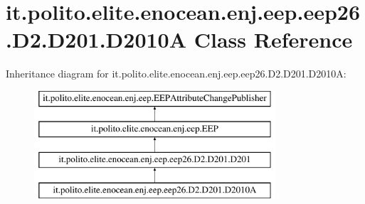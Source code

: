 \hypertarget{classit_1_1polito_1_1elite_1_1enocean_1_1enj_1_1eep_1_1eep26_1_1_d2_1_1_d201_1_1_d2010_a}{}\section{it.\+polito.\+elite.\+enocean.\+enj.\+eep.\+eep26.\+D2.\+D201.\+D2010A Class Reference}
\label{classit_1_1polito_1_1elite_1_1enocean_1_1enj_1_1eep_1_1eep26_1_1_d2_1_1_d201_1_1_d2010_a}
Inheritance diagram for it.\+polito.\+elite.\+enocean.\+enj.\+eep.\+eep26.\+D2.\+D201.\+D2010A\+:\begin{figure}[H]
\begin{center}
\leavevmode
\includegraphics[height=4.000000cm]{classit_1_1polito_1_1elite_1_1enocean_1_1enj_1_1eep_1_1eep26_1_1_d2_1_1_d201_1_1_d2010_a}
\end{center}
\end{figure}
